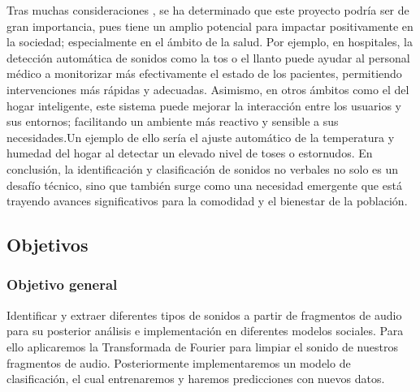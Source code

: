 Tras muchas consideraciones , se ha determinado que este proyecto podría ser de gran  importancia, pues tiene un amplio potencial para impactar positivamente en la sociedad; especialmente en el ámbito de la salud. Por ejemplo, en hospitales, la detección automática de sonidos como la tos o el llanto puede ayudar al personal médico a monitorizar más efectivamente el estado de los pacientes, permitiendo intervenciones más rápidas y adecuadas. 
Asimismo, en otros ámbitos como el del hogar inteligente, este sistema puede mejorar la interacción entre los usuarios y sus entornos; facilitando un ambiente más reactivo y sensible a sus necesidades.Un ejemplo de ello sería el ajuste automático de la temperatura y humedad del hogar al detectar un elevado nivel de toses o estornudos.
En conclusión, la identificación y clasificación de sonidos no verbales no solo es un desafío técnico, sino que también surge como una necesidad emergente que está trayendo avances significativos para la comodidad y el bienestar de la población.
\subsection{Objetivos}
\subsubsection{Objetivo general}
Identificar y extraer diferentes tipos de sonidos a partir de fragmentos de audio para su posterior análisis e implementación en diferentes modelos sociales. Para ello aplicaremos la Transformada de Fourier para limpiar el sonido de nuestros fragmentos de audio. Posteriormente implementaremos un modelo de clasificación, el cual entrenaremos y haremos predicciones con nuevos datos.
